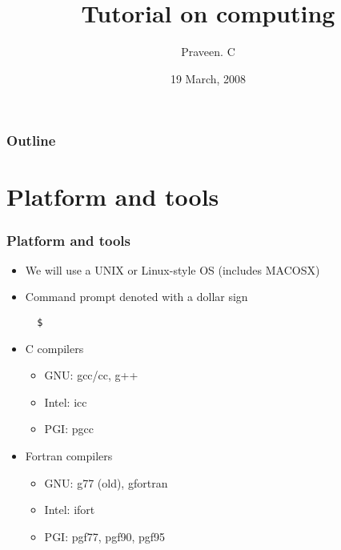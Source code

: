 \documentclass{beamer}
\title[Tutorial on computing] %
{Tutorial on computing}
\author[] %
{Praveen. C}
\institute[TIFR-CAM] %
{
   TIFR-CAM \\
   Bangalore \\
{\tt praveen@math.tifrbng.res.in} \\
}
\date[19 March, 2008] %
{19 March, 2008}
\begin{document}
\begin{frame}
  \titlepage
\end{frame}

\begin{frame}
  \frametitle{Outline}
  \tableofcontents
\end{frame}
\section{Platform and tools}
\begin{frame}[fragile]
  \frametitle{Platform and tools}

  \begin{itemize}

  \item We will use a UNIX or Linux-style OS (includes MACOSX)
  \item Command prompt denoted with a dollar sign
  \begin{verbatim}
  $
  \end{verbatim}
  \item C compilers

  \begin{itemize}
  \item GNU: gcc/cc, g++
  \item Intel: icc
  \item PGI: pgcc
  \end{itemize}

  \item Fortran compilers

  \begin{itemize}
  \item GNU: g77 (old), gfortran
  \item Intel: ifort
  \item PGI: pgf77, pgf90, pgf95
  \end{itemize}

  \end{itemize}

\end{frame}
\end{document}
